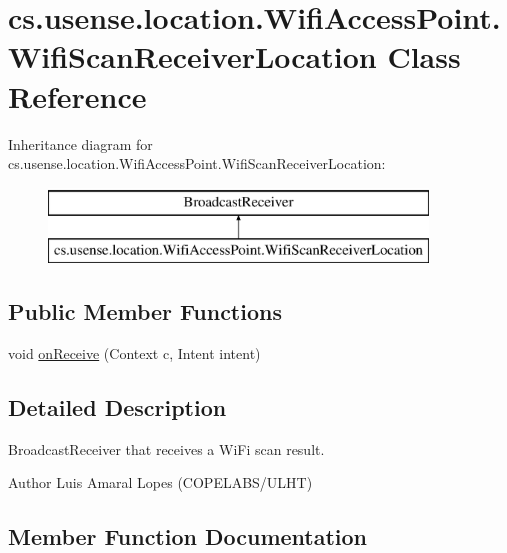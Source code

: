 \hypertarget{classcs_1_1usense_1_1location_1_1_wifi_access_point_1_1_wifi_scan_receiver_location}{}\section{cs.\+usense.\+location.\+Wifi\+Access\+Point.\+Wifi\+Scan\+Receiver\+Location Class Reference}
\label{classcs_1_1usense_1_1location_1_1_wifi_access_point_1_1_wifi_scan_receiver_location}
Inheritance diagram for cs.\+usense.\+location.\+Wifi\+Access\+Point.\+Wifi\+Scan\+Receiver\+Location\+:\begin{figure}[H]
\begin{center}
\leavevmode
\includegraphics[height=2.000000cm]{classcs_1_1usense_1_1location_1_1_wifi_access_point_1_1_wifi_scan_receiver_location}
\end{center}
\end{figure}
\subsection*{Public Member Functions}
\begin{DoxyCompactItemize}
\item 
void \hyperlink{classcs_1_1usense_1_1location_1_1_wifi_access_point_1_1_wifi_scan_receiver_location_a2685fd7c1baa69925ef451043c579fb9}{on\+Receive} (Context c, Intent intent)
\end{DoxyCompactItemize}


\subsection{Detailed Description}
Broadcast\+Receiver that receives a Wi\+Fi scan result. \begin{DoxyAuthor}{Author}
Luis Amaral Lopes (C\+O\+P\+E\+L\+A\+B\+S/\+U\+L\+H\+T) 
\end{DoxyAuthor}


\subsection{Member Function Documentation}
\hypertarget{classcs_1_1usense_1_1location_1_1_wifi_access_point_1_1_wifi_scan_receiver_location_a2685fd7c1baa69925ef451043c579fb9}{}
